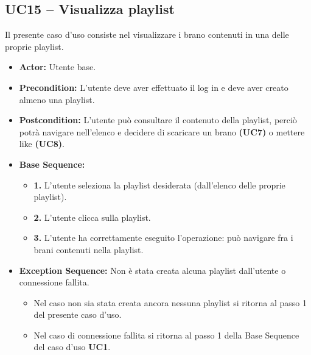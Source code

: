 \subsection{UC15 -- Visualizza playlist}
Il presente caso d'uso consiste nel visualizzare i brano contenuti in una delle proprie playlist. 
\begin{itemize}
    \item \textbf{Actor:} Utente base.
    \item \textbf{Precondition:} L'utente deve aver effettuato il log in e deve aver creato almeno una playlist.
    \item \textbf{Postcondition:} L'utente può consultare il contenuto della playlist, 
    perciò potrà navigare nell'elenco 
    e decidere di scaricare un brano \textbf{(UC7)} o mettere like \textbf{(UC8)}.
    \item \textbf{Base Sequence:}
    \begin{itemize}
        \item \textbf{1.} L'utente seleziona la playlist desiderata (dall'elenco delle proprie playlist).
        \item \textbf{2.} L'utente clicca sulla playlist.
        \item \textbf{3.} L'utente ha correttamente eseguito l'operazione: può navigare fra i brani contenuti nella playlist.
    \end{itemize}
    \item \textbf{Exception Sequence:} Non è stata creata alcuna playlist dall'utente o connessione fallita.
    \begin{itemize}
        \item Nel caso non sia stata creata ancora nessuna playlist si ritorna al passo 1 del presente caso d'uso.
        \item Nel caso di connessione fallita si ritorna al passo 1 della Base Sequence del caso d'uso \textbf{UC1}.
    \end{itemize}
\end{itemize}
\vspace{1cm}

